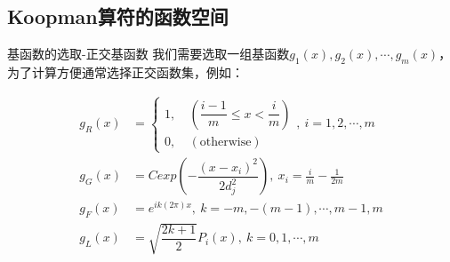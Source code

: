 \documentclass{beamer}
\begin{document}
	\subsection{Koopman算符的函数空间}
		\begin{frame}{基函数的选取-正交基函数}
			我们需要选取一组基函数$g_1(x),g_2(x),\cdots,g_m(x)$，为了计算方便通常选择正交函数集，例如：
			\begin{example}
				\begin{align*}
				g_R(x)&=
				\begin{cases}
				1,\ &(\dfrac{i-1}{m}\leqslant x<\dfrac{i}{m})\\
				0,\ &(\mbox{otherwise})
				\end{cases},\ i=1,2,\cdots,m\\
				g_G(x)&=Cexp\left(-\dfrac{(x-x_i)^2}{2d_j^2}\right), \ x_i=\frac{i}{m}-\frac{1}{2m}\\
				g_F(x)&=e^{ik(2\pi)x},\ k=-m,-(m-1),\cdots,m-1,m\\
				g_L(x)&=\sqrt{\dfrac{2k+1}{2}}P_i(x),\ k=0,1,\cdots,m
				\end{align*}
			\end{example}
		\end{frame}
\end{document}
